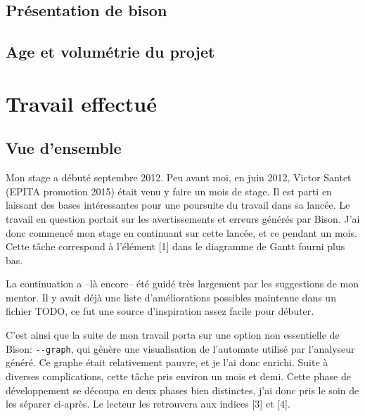 \documentclass[a4paper,11pt,twoside,final]{article}
\begin{document}
  \subsection{Présentation de bison}

  \subsection{Age et volumétrie du projet}

  \cleardoublepage

  \section{Travail effectué}

  \subsection{Vue d'ensemble}

  Mon stage a débuté septembre 2012. Peu avant moi, en juin 2012, Victor
  Santet (EPITA promotion 2015) était venu y faire un mois de stage. Il est
  parti en laissant des bases intéressantes pour une poursuite du travail dans
  sa lancée. Le travail en question portait sur les avertissements et erreurs
  générés par Bison. J'ai donc commencé mon stage en continuant sur cette
  lancée, et ce pendant un mois. Cette tâche correspond à l'élément [1] dans le
  diagramme de Gantt fourni plus bas.


  La continuation a --là encore-- été guidé très largement par les suggestions
  de mon mentor.  Il y avait déjà une liste d'améliorations possibles maintenue
  dans un fichier TODO, ce fut une source d'inspiration assez facile pour
  débuter.

  C'est ainsi que la suite de mon travail porta sur une option non essentielle
  de Bison: \texttt{-{}-graph}, qui génère une visualisation de l'automate utilisé
  par l'analyseur généré. Ce graphe était relativement pauvre, et je l'ai donc
  enrichi. Suite à diverses complications, cette tâche pris environ un mois et
  demi. Cette phase de développement se découpa en deux phases bien distinctes,
  j'ai donc pris le soin de les séparer ci-après. Le lecteur les retrouvera aux
  indices [3] et [4].
\end{document}
